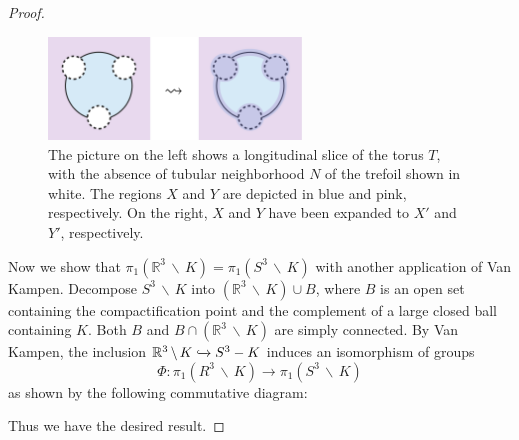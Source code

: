 \documentclass[12pt,twoside]{reedthesis}
\theoremstyle{definition}
\newcommand{\R}{\mathbb{R}}
\newcommand{\into}{\xhookrightarrow{}}
\newcommand{\wo}{\, \backslash \,}
\begin{document}
\begin{proof}
  \begin{figure}[t]
    \centering
    \includegraphics[width=0.6\textwidth]{figures/fundamental_group_side.pdf}
    \caption{The picture on the left shows a longitudinal slice of the torus $T$, with the absence of tubular neighborhood $N$ of the trefoil shown in white. The regions $X$ and $Y$ are depicted in blue and pink, respectively. On the right, $X$ and $Y$ have been expanded to $X'$ and $Y'$, respectively.}
    \label{fig:fundamental_group_side}
  \end{figure}

  Now we show that $\pi_1(\R^3 \wo K) = \pi_1(S^3 \wo K)$ with another application of Van Kampen.
  Decompose $S^3 \wo K$ into $(\R^3 \wo K) \cup B$, where $B$ is an open set containing the compactification point and the complement of a large closed ball containing $K$.
  Both $B$ and $B \cap (\R^3 \wo K)$ are simply connected.
  By Van Kampen, the inclusion $\R^3 \wo K \into S^3 - K$ induces an isomorphism of groups
  \begin{equation*}
    \Phi : \pi_1(R^3 \wo K) \to \pi_1(S^3 \wo K)
  \end{equation*}
  as shown by the following commutative diagram:
  \begin{center}
  \end{center}
  Thus we have the desired result.
\end{proof}
\end{document}
